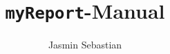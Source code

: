 \documentclass{myReport}
\title{\texttt{myReport}-Manual}
\author{Jasmin Sebastian}
\begin{document}
	
	
\blinddocument
	
	
\end{document}
